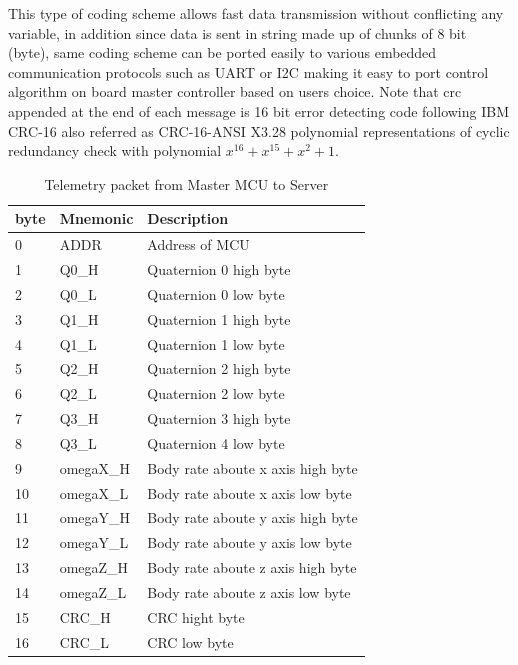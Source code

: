 This type of coding scheme allows fast data transmission without conflicting any variable, in addition since data is sent in string made up of chunks of 8 bit (byte), same coding scheme can be ported easily to various embedded communication protocols such as UART or I2C making it easy to port control algorithm on board master controller based on users choice. Note that \acrshort{crc} appended at the end of each message is 16 bit error detecting code following IBM CRC-16 also referred as CRC-16-ANSI X3.28 polynomial representations of cyclic redundancy check with polynomial $x^{16}+x^{15}+x^2+1$.
\begin{table}[ht]
        \centering
        
\begin{tabular}{|p{}|p{}|p{}|}
\hline 
 byte & Mnemonic & Description \\
\hline 
 0 & ADDR & Address of MCU \\
\hline 
 1 & Q0\_H & Quaternion 0 high byte \\
\hline 
 2 & Q0\_L & Quaternion 0 low byte \\
\hline 
 3 & Q1\_H & Quaternion 1 high byte \\
\hline 
 4 & Q1\_L & Quaternion 1 low byte \\
\hline 
 5 & Q2\_H & Quaternion 2 high byte \\
\hline 
 6 & Q2\_L & Quaternion 2 low byte \\
\hline 
 7 & Q3\_H & Quaternion 3 high byte \\
\hline 
 8 & Q3\_L & Quaternion 4 low byte \\
\hline 
 9 & omegaX\_H & Body rate aboute x axis high byte \\
\hline 
 10 & omegaX\_L & Body rate aboute x axis low byte \\
\hline 
 11 & omegaY\_H & Body rate aboute y axis high byte \\
\hline 
 12 & omegaY\_L & Body rate aboute y axis low byte \\
\hline 
 13 & omegaZ\_H & Body rate aboute z axis high byte \\
\hline 
 14 & omegaZ\_L & Body rate aboute z axis low byte \\
\hline 
 15 & CRC\_H & CRC hight byte \\
\hline 
 16 & CRC\_L & CRC low byte \\
 \hline
\end{tabular}
        \caption{Telemetry packet from Master MCU to Server}
        \label{tbl:tlm_m2s}
        \end{table}

